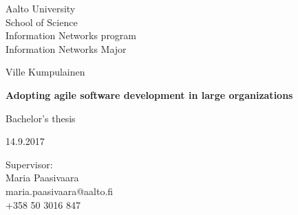 \begin{titlepage}
    \begin{flushleft}
    \begin{minipage}{15cm}
        \linespread{1.0}\small
        Aalto University\\
        School of Science \\
        Information Networks program \\
        Information Networks Major
        \par
    \end{minipage}
    \end{flushleft}
    \centering
    \vspace{3cm}
    {\Large Ville Kumpulainen \par}
    {\LARGE\bfseries Adopting agile software development in large organizations\par}
    \vspace{5cm}
    \raggedright{}
    {\large Bachelor's thesis\par}
    {\large 14.9.2017}
    \vfill

    \begin{flushleft}
    \begin{minipage}{15cm}
        \linespread{1.0}\small
        Supervisor:\\
        Maria Paasivaara\\
        maria.paasivaara@aalto.fi \\
        +358 50 3016 847 \\
        \par
    \end{minipage}
    \end{flushleft}


\end{titlepage}
